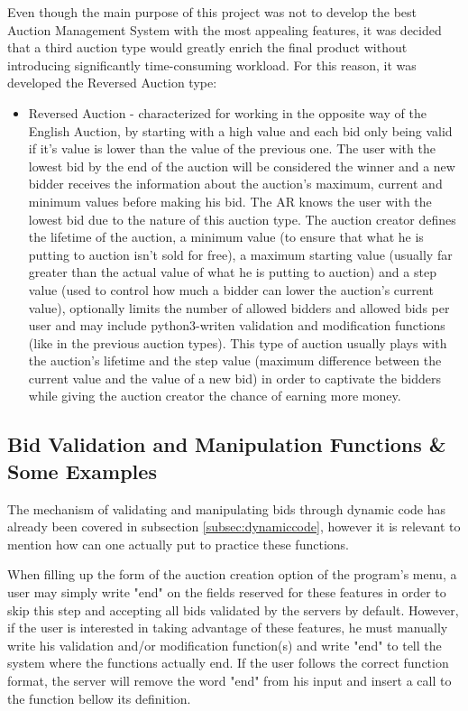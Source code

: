 \documentclass[a4paper]{article}
\begin{document}
Even though the main purpose of this project was not to develop the best Auction Management System with the most appealing features, it was decided that a third auction type would greatly enrich the final product without introducing significantly time-consuming workload.
For this reason, it was developed the Reversed Auction type:
\begin{itemize}
\item Reversed Auction - characterized for working in the opposite way of the English Auction, by starting with a high value and each bid only being valid if it's value is lower than the value of the previous one. The user with the lowest bid by the end of the auction will be considered the winner and a new bidder receives the information about the auction's maximum, current and minimum values before making his bid. The AR knows the user with the lowest bid due to the nature of this auction type. The auction creator defines the lifetime of the auction, a minimum value (to ensure that what he is putting to auction isn't sold for free), a maximum starting value (usually far greater than the actual value of what he is putting to auction) and a step value (used to control how much a bidder can lower the auction's current value), optionally limits the number of allowed bidders and allowed bids per user and may include python3-writen validation and modification functions (like in the previous auction types). This type of auction usually plays with the auction's lifetime and the step value (maximum difference between the current value and the value of a new bid) in order to captivate the bidders while giving the auction creator the chance of earning more money.
\end{itemize}

\subsection{Bid Validation and Manipulation Functions \& Some Examples}
\label{subsec:bidvalidationandmanipulationfunctionsandsomeexamples}

The mechanism of validating and manipulating bids through dynamic code has already been covered in subsection \ref{subsec:dynamiccode}, however it is relevant to mention how can one actually put to practice these functions.

When filling up the form of the auction creation option of the program's menu, a user may simply write "end" on the fields reserved for these features in order to skip this step and accepting all bids validated by the servers by default. 
However, if the user is interested in taking advantage of these features, he must manually write his validation and/or modification function(s) and write "end" to tell the system where the functions actually end.
If the user follows the correct function format, the server will remove the word "end" from his input and insert a call to the function bellow its definition.
\end{document}
